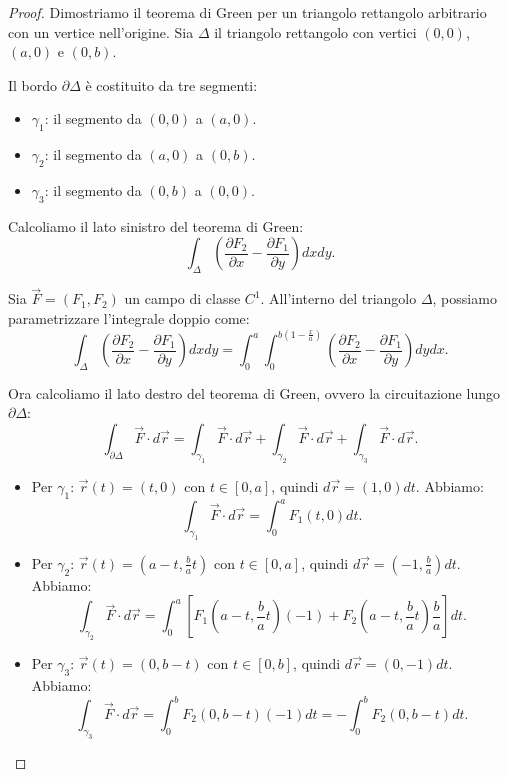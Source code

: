 \begin{proof}
Dimostriamo il teorema di Green per un triangolo rettangolo arbitrario con un vertice nell'origine. Sia $\Delta$ il triangolo rettangolo con vertici $(0,0)$, $(a,0)$ e $(0,b)$.

Il bordo $\partial \Delta$ è costituito da tre segmenti:
\begin{itemize}
  \item $\gamma_1$: il segmento da $(0,0)$ a $(a,0)$.
  \item $\gamma_2$: il segmento da $(a,0)$ a $(0,b)$.
  \item $\gamma_3$: il segmento da $(0,b)$ a $(0,0)$.
\end{itemize}

Calcoliamo il lato sinistro del teorema di Green:
$$ \int_\Delta \left(\frac{\partial F_2}{\partial x} - \frac{\partial F_1}{\partial y}\right) dxdy. $$

Sia $\vec{F} = (F_1, F_2)$ un campo di classe $C^1$. All'interno del triangolo $\Delta$, possiamo parametrizzare l'integrale doppio come:
$$ \int_\Delta \left(\frac{\partial F_2}{\partial x} - \frac{\partial F_1}{\partial y}\right) dxdy = \int_0^a \int_0^{b(1 - \frac{x}{a})} \left(\frac{\partial F_2}{\partial x} - \frac{\partial F_1}{\partial y}\right) dydx. $$

Ora calcoliamo il lato destro del teorema di Green, ovvero la circuitazione lungo $\partial \Delta$:
$$ \int_{\partial \Delta} \vec{F} \cdot d\vec{r} = \int_{\gamma_1} \vec{F} \cdot d\vec{r} + \int_{\gamma_2} \vec{F} \cdot d\vec{r} + \int_{\gamma_3} \vec{F} \cdot d\vec{r}. $$

\begin{itemize}
  \item Per $\gamma_1$: $\vec{r}(t) = (t, 0)$ con $t \in [0, a]$, quindi $d\vec{r} = (1, 0) dt$. Abbiamo:
  $$ \int_{\gamma_1} \vec{F} \cdot d\vec{r} = \int_0^a F_1(t, 0) dt. $$

  \item Per $\gamma_2$: $\vec{r}(t) = (a - t, \frac{b}{a}t)$ con $t \in [0, a]$, quindi $d\vec{r} = (-1, \frac{b}{a}) dt$. Abbiamo:
  $$ \int_{\gamma_2} \vec{F} \cdot d\vec{r} = \int_0^a \left[ F_1(a - t, \frac{b}{a}t)(-1) + F_2(a - t, \frac{b}{a}t)\frac{b}{a} \right] dt. $$

  \item Per $\gamma_3$: $\vec{r}(t) = (0, b - t)$ con $t \in [0, b]$, quindi $d\vec{r} = (0, -1) dt$. Abbiamo:
  $$ \int_{\gamma_3} \vec{F} \cdot d\vec{r} = \int_0^b F_2(0, b - t)(-1) dt = -\int_0^b F_2(0, b - t) dt. $$
\end{itemize}


\end{proof}
